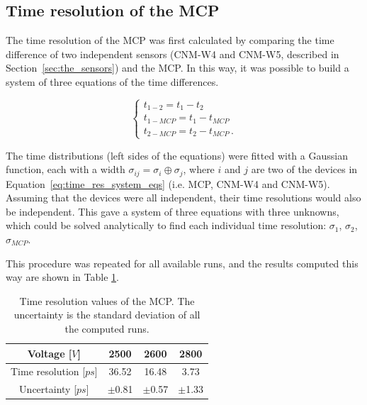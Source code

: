 \subsection{Time resolution of the MCP}
The time resolution of the MCP was first calculated by comparing the time difference of two independent sensors (CNM-W4 and CNM-W5, described in Section~\ref{sec:the_sensors}) and the MCP. In this way, it was possible to build a system of three equations of the time differences.

\begin{equation}\label{eq:time_res_system_eqs}
    \begin{cases}
        t_{1-2} = t_1 - t_2  \\
        t_{1-MCP} = t_1 - t_{MCP} \\
        t_{2-MCP} = t_2 - t_{MCP} \, .
    \end{cases}
\end{equation}

The time distributions (left sides of the equations) were fitted with a Gaussian function, each with a width \(\sigma_{ij} = \sigma_i \oplus \sigma_j\), where \(i\) and \(j\) are two of the devices in Equation~\ref{eq:time_res_system_eqs} (i.e. MCP, CNM-W4 and CNM-W5). Assuming that the devices were all independent, their time resolutions would also be independent. This gave a system of three equations with three unknowns, which could be solved analytically to find each individual time resolution: \(\sigma_1\), \(\sigma_2\), \(\sigma_{MCP}\).

This procedure was repeated for all available runs, and the results computed this way are shown in Table \ref{tab:MCP_time_resolution}.
\begin{table}[h!tbp]
    \begin{center}
        \captionsetup{width=\captionwidth}
        \caption{Time resolution values of the MCP. The uncertainty is the standard deviation of all the computed runs.}
        \label{tab:MCP_time_resolution}
        \begin{tabular}{ | c | c | c | c | }
            \hline
            Voltage [\(\si{V}\)] & 2500 & 2600 & 2800 \\ 
            \hline 
            Time resolution [\(\si{ps}\)] & 36.52 & 16.48 & 3.73 \\  
            Uncertainty [\(\si{ps}\)] & \(\pm\)0.81 & \(\pm\)0.57 & \(\pm\)1.33 \\
            \hline
        \end{tabular}
    \end{center}
\end{table}


